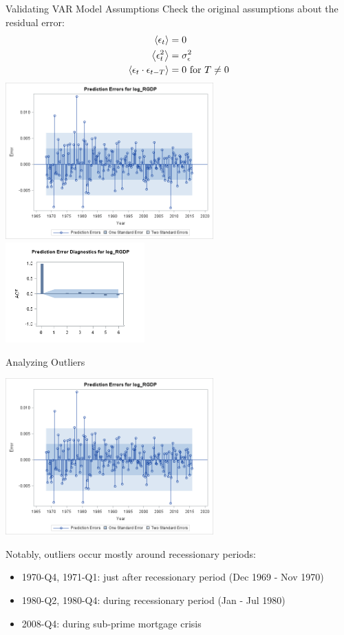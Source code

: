 \begin{frame}{Validating VAR Model Assumptions}
    Check the original assumptions about the residual error:
    \begin{align*}
        \left< \epsilon_t \right> &= 0 \\
        \left< \epsilon_t^2 \right> &= \sigma_\epsilon^2 \\
        \left< \epsilon_t \cdot \epsilon_{t-T} \right> &= 0 \text{ for } T \neq 0
    \end{align*}
    \includegraphics[width=0.6\textwidth,height=0.6\textheight]{../img/model1-residuals.png}
    \includegraphics[width=0.4\textwidth]{../img/model1-residualdiagnostics.png}
\end{frame}

\begin{frame}{Analyzing Outliers}
    \begin{center}
        \includegraphics[width=0.6\textwidth,height=0.55\textheight]{../img/model1-residuals.png}
    \end{center}
    Notably, outliers occur mostly around recessionary periods:
    \begin{itemize}
        \item 1970-Q4, 1971-Q1: just after recessionary period (Dec 1969 - Nov 1970)
        \item 1980-Q2, 1980-Q4: during recessionary period (Jan - Jul 1980)
        \item 2008-Q4: during sub-prime mortgage crisis
    \end{itemize}
\end{frame}

